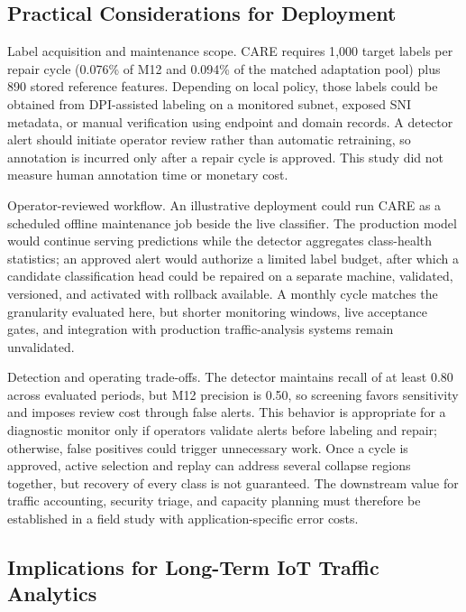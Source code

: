 \documentclass[journal]{IEEEtran}
\newcommand{\ours}{CARE}  %
\begin{document}
\subsection{Practical Considerations for Deployment}
\label{sec:discussion_deployment}

Label acquisition and maintenance scope.
\ours{} requires 1{,}000 target labels per repair cycle (0.076\% of M12 and 0.094\% of the matched adaptation pool) plus 890 stored reference features. Depending on local policy, those labels could be obtained from DPI-assisted labeling on a monitored subnet, exposed SNI metadata, or manual verification using endpoint and domain records. A detector alert should initiate operator review rather than automatic retraining, so annotation is incurred only after a repair cycle is approved. This study did not measure human annotation time or monetary cost.

Operator-reviewed workflow.
An illustrative deployment could run \ours{} as a scheduled offline maintenance job beside the live classifier. The production model would continue serving predictions while the detector aggregates class-health statistics; an approved alert would authorize a limited label budget, after which a candidate classification head could be repaired on a separate machine, validated, versioned, and activated with rollback available. A monthly cycle matches the granularity evaluated here, but shorter monitoring windows, live acceptance gates, and integration with production traffic-analysis systems remain unvalidated.

Detection and operating trade-offs.
The detector maintains recall of at least 0.80 across evaluated periods, but M12 precision is 0.50, so screening favors sensitivity and imposes review cost through false alerts. This behavior is appropriate for a diagnostic monitor only if operators validate alerts before labeling and repair; otherwise, false positives could trigger unnecessary work. Once a cycle is approved, active selection and replay can address several collapse regions together, but recovery of every class is not guaranteed. The downstream value for traffic accounting, security triage, and capacity planning must therefore be established in a field study with application-specific error costs.

\subsection{Implications for Long-Term IoT Traffic Analytics}
\label{sec:discussion_iot}
\end{document}
